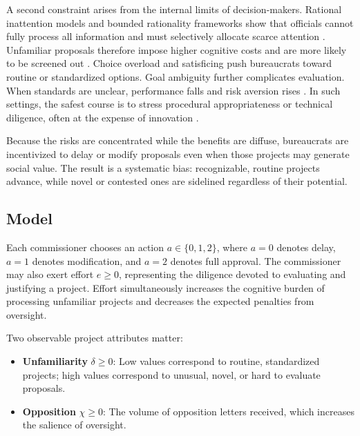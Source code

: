 A second constraint arises from the internal limits of decision-makers. Rational inattention models \citep{HebertWoodford2023} and bounded rationality frameworks \citep{deClippelRozen2021} show that officials cannot fully process all information and must selectively allocate scarce attention \citep{BesleyGhatak2003}. Unfamiliar proposals therefore impose higher cognitive costs and are more likely to be screened out \citep{DeFrancescoRadaelliTroeger2012}. Choice overload and satisficing push bureaucrats toward routine or standardized options. Goal ambiguity further complicates evaluation. When standards are unclear, performance falls and risk aversion rises \citep{AndersonStritch2016}. In such settings, the safest course is to stress procedural appropriateness or technical diligence, often at the expense of innovation \citep{Gilad2015,Duvanova2012}.

Because the risks are concentrated while the benefits are diffuse, bureaucrats are incentivized to delay or modify proposals even when those projects may generate social value. The result is a systematic bias: recognizable, routine projects advance, while novel or contested ones are sidelined regardless of their potential.


\subsection{Model}

Each commissioner chooses an action $a \in \{0,1,2\}$, where $a=0$ denotes delay, $a=1$ denotes modification, and $a=2$ denotes full approval. The commissioner may 
also exert effort $e \geq 0$, representing the diligence devoted to evaluating and justifying a project. Effort simultaneously increases the cognitive burden of processing unfamiliar projects and decreases the expected penalties from oversight.

Two observable project attributes matter:

\begin{itemize}
    \item \textbf{Unfamiliarity} $\delta \geq 0$: Low values correspond to routine, standardized projects; high values correspond to unusual, novel, or hard to evaluate proposals.
    \item \textbf{Opposition} $\chi \geq 0$: The volume of opposition letters received, which increases the salience of oversight.
\end{itemize}

